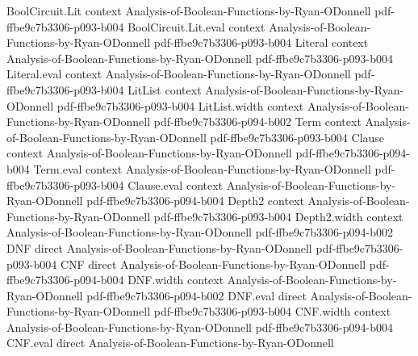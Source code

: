 \begin{lemma}
\label{LowDegreeTest.gowers_U2_fourier}
\leanok
{}
\proofstep
  {BoolCircuit.Lit}
  {context}
  {Analysis-of-Boolean-Functions-by-Ryan-ODonnell}
  {pdf-ffbe9c7b3306-p093-b004}
\proofstep
  {BoolCircuit.Lit.eval}
  {context}
  {Analysis-of-Boolean-Functions-by-Ryan-ODonnell}
  {pdf-ffbe9c7b3306-p093-b004}
\proofstep
  {Literal}
  {context}
  {Analysis-of-Boolean-Functions-by-Ryan-ODonnell}
  {pdf-ffbe9c7b3306-p093-b004}
\proofstep
  {Literal.eval}
  {context}
  {Analysis-of-Boolean-Functions-by-Ryan-ODonnell}
  {pdf-ffbe9c7b3306-p093-b004}
\proofstep
  {LitList}
  {context}
  {Analysis-of-Boolean-Functions-by-Ryan-ODonnell}
  {pdf-ffbe9c7b3306-p093-b004}
\proofstep
  {LitList.width}
  {context}
  {Analysis-of-Boolean-Functions-by-Ryan-ODonnell}
  {pdf-ffbe9c7b3306-p094-b002}
\proofstep
  {Term}
  {context}
  {Analysis-of-Boolean-Functions-by-Ryan-ODonnell}
  {pdf-ffbe9c7b3306-p093-b004}
\proofstep
  {Clause}
  {context}
  {Analysis-of-Boolean-Functions-by-Ryan-ODonnell}
  {pdf-ffbe9c7b3306-p094-b004}
\proofstep
  {Term.eval}
  {context}
  {Analysis-of-Boolean-Functions-by-Ryan-ODonnell}
  {pdf-ffbe9c7b3306-p093-b004}
\proofstep
  {Clause.eval}
  {context}
  {Analysis-of-Boolean-Functions-by-Ryan-ODonnell}
  {pdf-ffbe9c7b3306-p094-b004}
\proofstep
  {Depth2}
  {context}
  {Analysis-of-Boolean-Functions-by-Ryan-ODonnell}
  {pdf-ffbe9c7b3306-p093-b004}
\proofstep
  {Depth2.width}
  {context}
  {Analysis-of-Boolean-Functions-by-Ryan-ODonnell}
  {pdf-ffbe9c7b3306-p094-b002}
\proofstep
  {DNF}
  {direct}
  {Analysis-of-Boolean-Functions-by-Ryan-ODonnell}
  {pdf-ffbe9c7b3306-p093-b004}
\proofstep
  {CNF}
  {direct}
  {Analysis-of-Boolean-Functions-by-Ryan-ODonnell}
  {pdf-ffbe9c7b3306-p094-b004}
\proofstep
  {DNF.width}
  {context}
  {Analysis-of-Boolean-Functions-by-Ryan-ODonnell}
  {pdf-ffbe9c7b3306-p094-b002}
\proofstep
  {DNF.eval}
  {direct}
  {Analysis-of-Boolean-Functions-by-Ryan-ODonnell}
  {pdf-ffbe9c7b3306-p093-b004}
\proofstep
  {CNF.width}
  {context}
  {Analysis-of-Boolean-Functions-by-Ryan-ODonnell}
  {pdf-ffbe9c7b3306-p094-b004}
\proofstep
  {CNF.eval}
  {direct}
  {Analysis-of-Boolean-Functions-by-Ryan-ODonnell}

\end{lemma}
